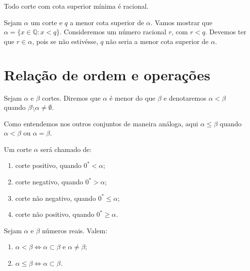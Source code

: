 \documentclass[../main.tex]{subfiles}
\begin{document}
\begin{teo}
    Todo corte com cota superior mínima é racional.
\end{teo}
\begin{dem}
    Sejam $\alpha$ um corte e $q$ a menor cota superior de $\alpha$. Vamos mostrar que $\alpha = \{ x \in \mathbb{Q} : x < q \}$.
    Consideremos um número racional $r$, com $r < q$. Devemos ter que $r \in \alpha$, pois se não estivésse, $q$ não seria a menor cota superior de $\alpha$.
\end{dem}



\section{Relação de ordem e operações}

\begin{defi}\label{reais-def-relacaoOrdem}
    Sejam $\alpha$ e $\beta$ cortes. Diremos que $\alpha$ é menor do que $\beta$ e denotaremos $\alpha < \beta$ quando $\beta \setminus \alpha \neq \emptyset$.
\end{defi}
\begin{obs}
    Como entendemos nos outros conjuntos de maneira análoga, aqui $\alpha \leq \beta$ quando $\alpha < \beta$ ou $\alpha = \beta$.
\end{obs}
\begin{defi}
    Um corte $\alpha$ será chamado de:
    \begin{enumerate}[label=(\roman*)]
        \item corte positivo, quando $0^* < \alpha$;
        \item corte negativo, quando $0^* > \alpha$;
        \item corte não negativo, quando $0^* \leq \alpha$;
        \item corte não positivo, quando $0^* \geq \alpha$.
    \end{enumerate}
\end{defi}

\begin{teo}\label{reais-teo-subset}
    Sejam $\alpha$ e $\beta$ números reais. Valem:
    \begin{enumerate}[label=(\roman*)]
        \item $\alpha < \beta \iff \alpha \subset \beta$ e $\alpha \neq \beta$;
        \item $\alpha \leq \beta \iff \alpha \subset \beta$.
    \end{enumerate}
\end{teo}
\end{document}
